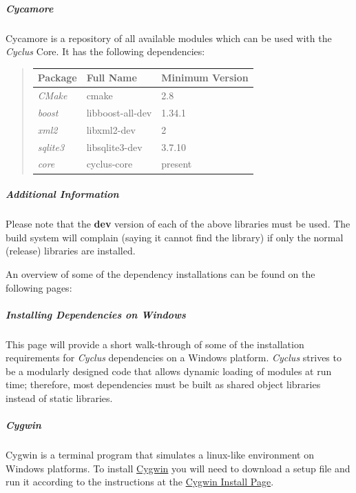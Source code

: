 \documentclass[letterpaper,10pt,english]{sphinxmanual}
\begin{document}
\subparagraph{Cycamore}
\label{devdoc/get_and_build:id2}
Cycamore is a repository of all available modules which can be used
with the \emph{Cyclus} Core. It has the following dependencies:
\begin{quote}

\begin{tabulary}{\linewidth}{|L|L|L|}
\hline
\textbf{
Package
} & \textbf{
Full Name
} & \textbf{
Minimum Version
}\\\hline

\emph{CMake}
 & 
cmake
 & 
2.8
\\\hline

\emph{boost}
 & 
libboost-all-dev
 & 
1.34.1
\\\hline

\emph{xml2}
 & 
libxml2-dev
 & 
2
\\\hline

\emph{sqlite3}
 & 
libsqlite3-dev
 & 
3.7.10
\\\hline

\emph{core}
 & 
cyclus-core
 & 
present
\\\hline
\end{tabulary}

\end{quote}


\subparagraph{Additional Information}
\label{devdoc/get_and_build:additional-information}
Please note that the \textbf{dev} version of each of the above
libraries must be used. The build system will complain (saying it
cannot find the library) if only the normal (release) libraries are
installed.

An overview of some of the dependency installations
can be found on the following pages:


\subparagraph{Installing Dependencies on Windows}
\label{devdoc/dependencies_windows:installing-dependencies-on-windows}\label{devdoc/dependencies_windows::doc}
This page will provide a short walk-through of some of the installation
requirements for \emph{Cyclus} dependencies on a Windows platform. \emph{Cyclus} strives
to be a modularly designed code that allows dynamic loading of modules at run
time; therefore, most dependencies must be built as shared object libraries
instead of static libraries.


\subparagraph{Cygwin}
\label{devdoc/dependencies_windows:cygwin}
Cygwin is a terminal program that simulates a linux-like environment on Windows
platforms. To install \href{http://cygwin.com}{Cygwin} you will need to download a setup file and run it
according to the instructions at the \href{http://cygwin.com/install.html}{Cygwin Install Page}.
\end{document}
